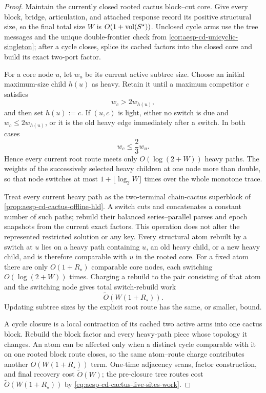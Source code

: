 \begin{proof}
Maintain the currently closed rooted cactus block--cut core.  Give every
block, bridge, articulation, and attached response record its positive
structural size, so the final total size
$W$ is $O(1+\operatorname{vol}(S^\star))$.  Unclosed cycle arms use the tree messages and
the unique double-frontier check from
\cref{cor:aesp-cd-unicyclic-singleton}; after a cycle closes, splice its
cached factors into the closed core and build its exact two-port factor.

For a core node $u$, let $w_u$ be its current active subtree size.  Choose an
initial maximum-size child $h(u)$ as heavy.  Retain it until a maximum
competitor $c$ satisfies
\begin{equation*}
 w_c>2w_{h(u)},
\end{equation*}
and then set $h(u):=c$.  If $(u,c)$ is light, either no switch is due and
$w_c\leq2w_{h(u)}$, or it is the old heavy edge immediately after a switch.
In both cases
\begin{equation*}
 w_c\leq\frac23 w_u.
\end{equation*}
Hence every current root route meets only $O(\log(2+W))$ heavy paths.  The
weights of the successively selected heavy children at one node more than
double, so that node switches at most $1+\lfloor\log_2 W\rfloor$ times over
the whole monotone trace.

Treat every current heavy path as the two-terminal chain-cactus superblock
of \cref{prop:aesp-cd-cactus-offline-hld}.  A switch cuts and concatenates a
constant number of such paths; rebuild their balanced series--parallel
parses and epoch snapshots from the current exact factors.  This operation
does not alter the represented restricted solution or any key.  Every
structural atom rebuilt by a switch at $u$ lies on a heavy path containing
$u$, an old heavy child, or a new heavy child, and is therefore comparable
with $u$ in the rooted core.  For a fixed atom there are only
$O(1+R_\star)$ comparable core nodes, each switching $O(\log(2+W))$ times.
Charging a rebuild to the pair consisting of that atom and the switching
node gives total switch-rebuild work
\begin{equation*}
 \widetilde O(W(1+R_\star)).
\end{equation*}
Updating subtree sizes by the explicit root route has the same, or smaller,
bound.

A cycle closure is a local contraction of its cached two active arms into
one cactus block.  Rebuild the block factor and every heavy-path piece whose
topology it changes.  An atom can be affected only when a distinct cycle
comparable with it on one rooted block route closes, so the same
atom--route charge contributes another
$O(W(1+R_\star))$ term.  One-time adjacency scans, factor construction, and
final recovery cost $\widetilde O(W)$; the pre-closure tree routes cost
$\widetilde O(W(1+R_\star))$ by
\cref{eq:aesp-cd-cactus-live-sites-work}.


\end{proof}
